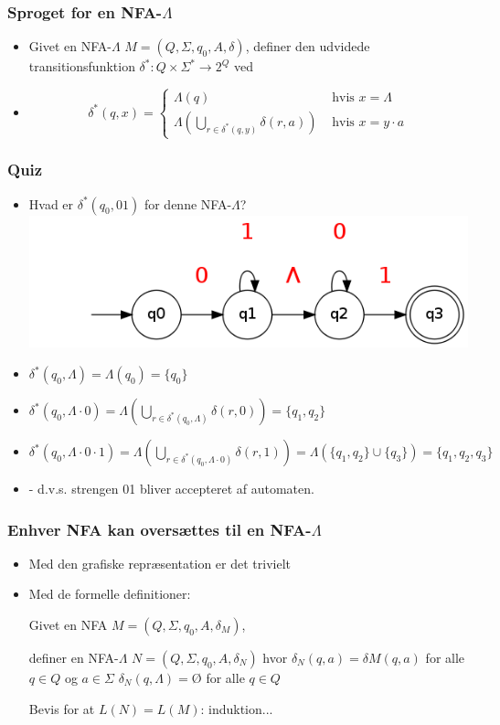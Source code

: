 \begin{frame}
\frametitle{Sproget for en NFA-$\Lambda$}
\begin{itemize}[<+->]
\item Givet en NFA-$\Lambda$  $M=(Q, \Sigma , q_0, A, \delta )$, definer 
den udvidede transitionsfunktion $\delta^*: Q\times \Sigma^*\rightarrow  2^Q$ ved
\item \[\delta^*(q,x) =
  \begin{cases}
    \Lambda(q) & \text{ hvis } x=\Lambda \\
    \Lambda(\bigcup_{r\in \delta^*(q, y)}\delta(r, a)) & \text{ hvis } x=y\cdot a
  \end{cases}
\]
\end{itemize}
\end{frame}
\begin{frame}
\frametitle{Quiz}
\begin{itemize}[<+->]
\item Hvad er $\delta^*(q_0, 01)$ for denne NFA-$\Lambda$?
\includegraphics[scale=0.4]{images/2_seminar_quiz_nfa_lambda}
\item $\delta^*(q_0, \Lambda) = \Lambda(q_0) = \{q_0\}$
\item $\delta^*(q_0, \Lambda \cdot 0) = \Lambda(\bigcup_{r\in \delta^*(q_0, \Lambda)} \delta(r, 0)) =
 \{q_1, q_2\}$
\item $\delta^*(q_0, \Lambda \cdot 0 \cdot 1) = 
\Lambda(\bigcup_{r\in \delta^*(q_0, \Lambda\cdot 0)} \delta(r, 1)) = \Lambda(\{q_1, q_2\}\cup\{q_3\}) = \{q_1, q_2, q_3\}$
\item - d.v.s. strengen 01 bliver accepteret af automaten.
\end{itemize}
\end{frame}

\begin{frame}
  \frametitle{Enhver NFA kan oversættes til en NFA-$\Lambda $}
\begin{itemize}[<+->]
\item Med den grafiske repræsentation er det trivielt

\item Med de formelle definitioner:

Givet en NFA $M=(Q, \Sigma , q_0, A, \delta_M)$, 

definer en NFA-$\Lambda $ $N=(Q, \Sigma , q_0, A, \delta_N)$ hvor 
$\delta_N(q, a) = \delta M(q, a)$  for alle $q\in Q$ og $a\in \Sigma$
$\delta_N(q, \Lambda) = Ø$ for alle $q\in Q$

Bevis for at $L(N) = L(M)$: induktion...
\end{itemize}
\end{frame}

